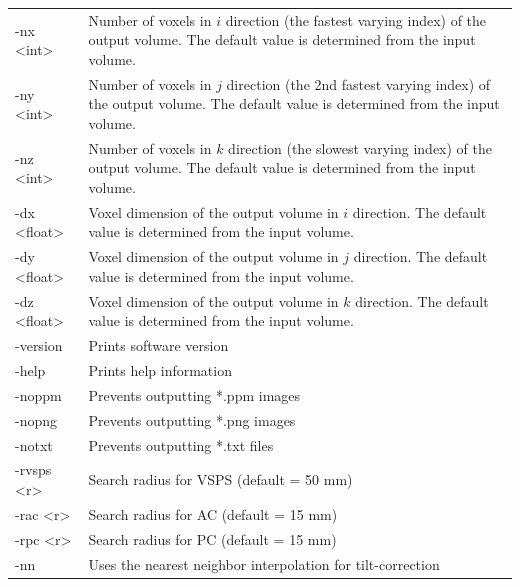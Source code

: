\documentclass[11pt]{article}
\begin{document}
\begin{longtable}{p{}p{}}
-nx \textless int\textgreater  &
	Number of voxels in $i$ direction (the fastest varying index) of the
	output volume. The default value is determined from the input volume. \\

-ny \textless int\textgreater  &
	Number of voxels in $j$ direction (the 2nd fastest varying index) of the
	output volume. The default value is determined from the input volume. \\

-nz \textless int\textgreater  &
	Number of voxels in $k$ direction (the slowest varying index) of the
	output volume. The default value is determined from the input volume. \\

-dx \textless float\textgreater &
	Voxel dimension of the output volume in $i$ direction. The default
	value is determined from the input volume. \\

-dy \textless float\textgreater &
	Voxel dimension of the output volume in $j$ direction. The default
	value is determined from the input volume. \\

-dz \textless float\textgreater &
	Voxel dimension of the output volume in $k$ direction. The default
	value is determined from the input volume. \\

-version &
	Prints software version \\

-help &
	Prints help information \\

-noppm &
	Prevents outputting *.ppm images \\

-nopng &
	Prevents outputting *.png images \\

-notxt &
	Prevents outputting *.txt files \\

-rvsps \textless r\textgreater  &
	Search radius for VSPS (default = 50 mm) \\

-rac \textless r\textgreater  &
	Search radius for AC (default = 15 mm) \\

-rpc \textless r\textgreater  &
	Search radius for PC (default = 15 mm) \\

-nn &
	Uses the nearest neighbor interpolation for tilt-correction 
\end{longtable}
\newpage
\end{document}
